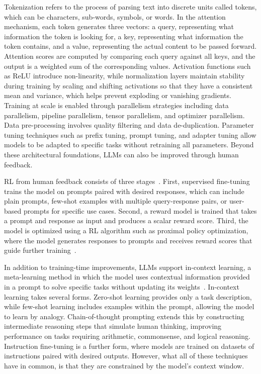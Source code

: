 \documentclass[
english,                 %
bibtex,                  %
includeExtraAbstracts, %
]{kththesis}
\numberwithin{listing}{chapter}
\begin{document}
Tokenization refers to the process of parsing text into discrete units called tokens, which can be characters, sub-words, symbols, or words. In the attention mechanism, each token generates three vectors: a query, representing what information the token is looking for, a key, representing what information the token contains, and a value, representing the actual content to be passed forward. Attention scores are computed by comparing each query against all keys, and the output is a weighted sum of the corresponding values. Activation functions such as \gls{ReLU} introduce non-linearity, while normalization layers maintain stability during training by scaling and shifting activations so that they have a consistent mean and variance, which helps prevent exploding or vanishing gradients. Training at scale is enabled through parallelism strategies including data parallelism, pipeline parallelism, tensor parallelism, and optimizer parallelism. Data pre-processing involves quality filtering and data de-duplication. Parameter tuning techniques such as prefix tuning, prompt tuning, and adapter tuning allow models to be adapted to specific tasks without retraining all parameters. Beyond these architectural foundations, \glspl{LLM} can also be improved through human feedback.

\Gls{RL} from human feedback consists of three stages~\cite{wu_brief_2023}. First, supervised fine-tuning trains the model on prompts paired with desired responses, which can include plain prompts, few-shot examples with multiple query-response pairs, or user-based prompts for specific use cases. Second, a reward model is trained that takes a prompt and response as input and produces a scalar reward score. Third, the model is optimized using a \gls{RL} algorithm such as proximal policy optimization, where the model generates responses to prompts and receives reward scores that guide further training~\cite{schulman_proximal_2017}.

In addition to training-time improvements, \glspl{LLM} support in-context learning, a meta-learning method in which the model uses contextual information provided in a prompt to solve specific tasks without updating its weights~\cite{yin_survey_2024}. In-context learning takes several forms. Zero-shot learning provides only a task description, while few-shot learning includes examples within the prompt, allowing the model to learn by analogy. Chain-of-thought prompting extends this by constructing intermediate reasoning steps that simulate human thinking, improving performance on tasks requiring arithmetic, commonsense, and logical reasoning. Instruction fine-tuning is a further form, where models are trained on datasets of instructions paired with desired outputs. However, what all of these techniques have in common, is that they are constrained by the model's context window.
\end{document}
